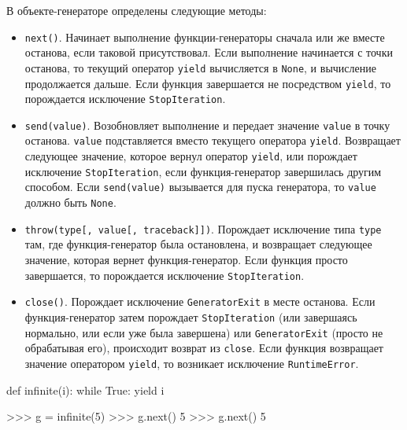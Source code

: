 В объекте-генераторе определены следующие методы:
\begin{itemize}
  \item \lstinline{next()}. Начинает выполнение функции-генераторы сначала или же вместе останова, если таковой присутствовал. Если выполнение начинается с точки останова, то текущий оператор \lstinline{yield} вычисляется в \lstinline{None}, и вычисление продолжается дальше. Если функция завершается не посредством \lstinline{yield}, то порождается исключение \lstinline{StopIteration}.

  \item \lstinline{send(value)}. Возобновляет выполнение и передает значение \lstinline{value} в точку останова. \lstinline{value} подставляется вместо текущего оператора \lstinline{yield}. Возвращает следующее значение, которое вернул оператор \lstinline{yield}, или порождает исключение \lstinline{StopIteration}, если функция-генератор завершилась другим способом. Если \lstinline{send(value)} вызывается для пуска генератора, то \lstinline{value} должно быть \lstinline{None}.
  \item \lstinline{throw(type[, value[, traceback]])}. Порождает исключение типа \lstinline{type} там, где функция-генератор была остановлена, и возвращает следующее значение, которая вернет функция-генератор. Если функция просто завершается, то порождается исключение \lstinline{StopIteration}.
  \item \lstinline{close()}. Порождает исключение \lstinline{GeneratorExit} в месте останова. Если функция-генератор затем порождает \lstinline{StopIteration} (или завершаясь нормально, или если уже была завершена) или \lstinline{GeneratorExit} (просто не обрабатывая его), происходит возврат из \lstinline{close}. Если функция возвращает значение оператором \lstinline{yield}, то возникает исключение \lstinline{RuntimeError}.
\end{itemize}

\begin{pylst}{}{}
def infinite(i):
    while True:
        yield i

>>> g = infinite(5)
>>> g.next()
5
>>> g.next()
5
\end{pylst}

